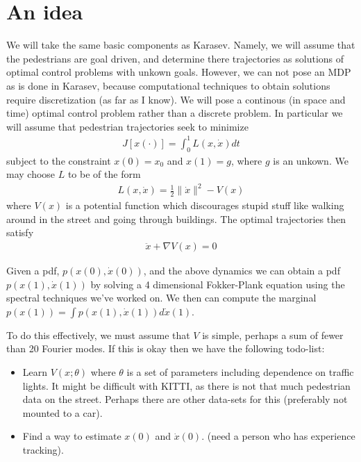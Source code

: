 \documentclass[12pt]{amsart}
\begin{document}
\section{An idea}
We will take the same basic components as Karasev.
Namely, we will assume that the pedestrians are goal driven, and determine there trajectories as solutions of optimal control problems with unkown goals.
However, we can not pose an MDP as is done in Karasev, because computational techniques to obtain solutions require discretization (as far as I know).
We will pose a continous (in space and time) optimal control problem rather than a discrete problem.
In particular we will assume that pedestrian trajectories seek to minimize
\begin{align*}
    J[x(\cdot) ] = \int_0^1 L(x,\dot{x}) dt
\end{align*}
subject to the constraint $x(0) = x_0$ and $x(1) = g$, where $g$ is an unkown.
We may choose $L$ to be of the form
\begin{align*}
    L(x,\dot{x}) = \frac{1}{2} \| \dot{x} \|^2 - V(x)
\end{align*}
where $V(x)$ is a potential function which discourages stupid stuff like walking around in the street and going through buildings.
The optimal trajectories then satisfy
\begin{align*}
    \ddot{x} + \nabla V(x) = 0
\end{align*}

Given a pdf, $p(x(0) , \dot{x}(0) )$, and the above dynamics we can obtain a pdf $p(x(1), \dot{x}(1))$ by solving a 4 dimensional Fokker-Plank equation using the spectral techniques we've worked on.
We then can compute the marginal $p(x(1) ) = \int p(x(1) , \dot{x}(1) ) d \dot{x}(1)$.

To do this effectively, we must assume that $V$ is simple, perhaps a sum of fewer than 20 Fourier modes.
If this is okay then we have the following todo-list:

\begin{itemize}
    \item Learn $V(x ; \theta )$ where $\theta$ is a set of parameters including dependence on traffic lights.
        It might be difficult with KITTI, as there is not that much pedestrian data on the street.
        Perhaps there are other data-sets for this (preferably not mounted to a car).
    \item Find a way to estimate $x(0)$ and $\dot{x}(0)$.  (need a person who has experience tracking).
\end{itemize}
\end{document}
